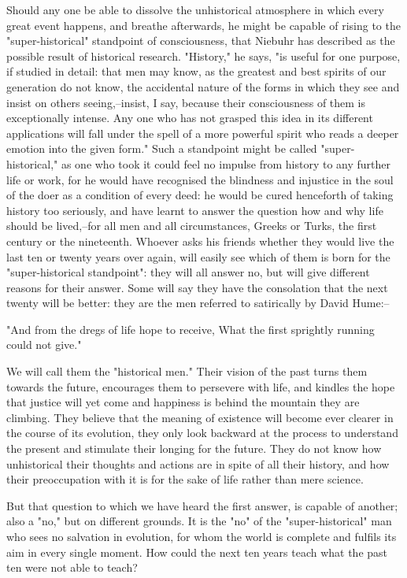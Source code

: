 Should any one be able to dissolve the unhistorical atmosphere in
which every great event happens, and breathe afterwards, he might be
capable of rising to the "super-historical" standpoint of
consciousness, that Niebuhr has described as the possible result of
historical research. "History," he says, "is useful for one purpose,
if studied in detail: that men may know, as the greatest and best
spirits of our generation do not know, the accidental nature of the
forms in which they see and insist on others seeing,--insist, I say,
because their consciousness of them is exceptionally intense. Any one
who has not grasped this idea in its different applications will fall
under the spell of a more powerful spirit who reads a deeper emotion
into the given form." Such a standpoint might be called
"super-historical," as one who took it could feel no impulse from
history to any further life or work, for he would have recognised the
blindness and injustice in the soul of the doer as a condition of
every deed: he would be cured henceforth of taking history too
seriously, and have learnt to answer the question how and why life
should be lived,--for all men and all circumstances, Greeks or Turks,
the first century or the nineteenth. Whoever asks his friends whether
they would live the last ten or twenty years over again, will easily
see which of them is born for the "super-historical standpoint": they
will all answer no, but will give different reasons for their answer.
Some will say they have the consolation that the next twenty will be
better: they are the men referred to satirically by David Hume:--

  "And from the dregs of life hope to receive,
  What the first sprightly running could not give."

We will call them the "historical men." Their vision of the past
turns them towards the future, encourages them to persevere with
life, and kindles the hope that justice will yet come and happiness
is behind the mountain they are climbing. They believe that the
meaning of existence will become ever clearer in the course of its
evolution, they only look backward at the process to understand the
present and stimulate their longing for the future. They do not know
how unhistorical their thoughts and actions are in spite of all their
history, and how their preoccupation with it is for the sake of life
rather than mere science.

But that question to which we have heard the first answer, is capable
of another; also a "no," but on different grounds. It is the "no" of
the "super-historical" man who sees no salvation in evolution, for
whom the world is complete and fulfils its aim in every single
moment. How could the next ten years teach what the past ten were not
able to teach?

